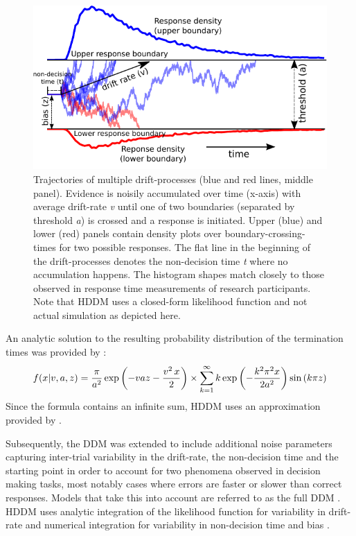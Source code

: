 \documentclass[letterpaper,10pt,english]{article}
\begin{document}
\begin{figure}
\centering
\capstart

\includegraphics{DDM.pdf}
\caption{Trajectories of multiple drift-processes (blue and red lines,
middle panel). Evidence is noisily accumulated over time (x-axis) with
average drift-rate \textit{v} until one of two boundaries (separated
by threshold \textit{a}) is crossed and a response is initiated. Upper
(blue) and lower (red) panels contain density plots over
boundary-crossing-times for two possible responses. The flat line in
the beginning of the drift-processes denotes the non-decision time
\textit{t} where no accumulation happens. The histogram shapes match
closely to those observed in response time measurements of research
participants. Note that HDDM uses a closed-form likelihood function
and not actual simulation as depicted here.}
\label{fig.ddm}
\end{figure}

An analytic solution to the resulting probability distribution of
the termination times was provided by \citet{Wald47,Feller68}:
\begin{gather}
\begin{split}f(x|v, a, z) = \frac{\pi}{a^2} \, \text{exp} \left(
-vaz-\frac{v^2\,x}{2} \right) \times \sum_{k=1}^{\infty} k\,
\text{exp} \left( -\frac{k^2\pi^2 x}{2a^2} \right)
\text{sin}\left(k\pi z\right)\end{split}\notag
\end{gather}
Since the formula contains an infinite sum, HDDM uses an approximation
provided by \citep{NavarroFuss09}.

Subsequently, the DDM was extended to include additional noise parameters capturing inter-trial variability in the drift-rate, the non-decision time and the starting point in order to account for two phenomena observed in decision making tasks, most notably cases where errors are faster or slower than correct responses. Models that take this into account are referred to as the full DDM \citep{RatcliffRouder98}. HDDM uses analytic integration of the likelihood function for variability in drift-rate and numerical integration for variability in non-decision time and bias \citep{RatcliffTuerlinckx02}.
\end{document}
